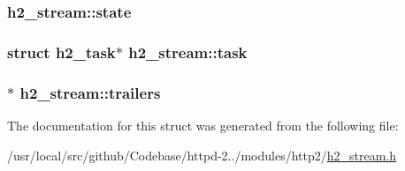 \subsubsection[{\texorpdfstring{state}{state}}]{ h2\+\_\+stream\+::state}\hypertarget{structh2__stream_a7efd6de540c234955a7cd92f64e788bc}{}\label{structh2__stream_a7efd6de540c234955a7cd92f64e788bc}
\subsubsection[{\texorpdfstring{task}{task}}]{\setlength{\rightskip}{0pt plus 5cm}struct {\bf h2\+\_\+task}$\ast$ h2\+\_\+stream\+::task}\hypertarget{structh2__stream_a0d0d34d0730b9c0e0219385703bbe0e3}{}\label{structh2__stream_a0d0d34d0730b9c0e0219385703bbe0e3}
\subsubsection[{\texorpdfstring{trailers}{trailers}}]{$\ast$ h2\+\_\+stream\+::trailers}\hypertarget{structh2__stream_a13e3f7f6ed16befdf6c0e5fb361650f9}{}\label{structh2__stream_a13e3f7f6ed16befdf6c0e5fb361650f9}


The documentation for this struct was generated from the following file\+:\begin{DoxyCompactItemize}
\item 
/usr/local/src/github/\+Codebase/httpd-\/2../modules/http2/\hyperlink{h2__stream_8h}{h2\+\_\+stream.\+h}\end{DoxyCompactItemize}

